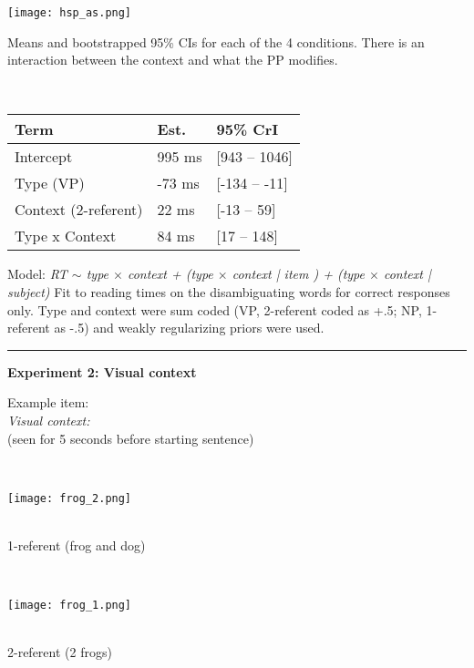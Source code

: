 \documentclass[11pt,a4paper]{article}
\begin{document}
\begin{minipage}{.5\textwidth}
	{	\texttt{[image: hsp\_as.png]}} 
	\begin{small}
	Means and bootstrapped 95\% CIs for each of the 4 conditions. There is an interaction between the context and what the PP modifies. 
		
	\end{small}
	
\end{minipage}
~~
\begin{minipage}{.45\textwidth}
	\begin{small}
	\begin{tabular}{|l|l|l|}
		\hline
		Term & Est. & 95\% CrI \\
		\hline
		Intercept & 995 ms & [943 -- 1046] \\
		Type (VP) & -73 ms & [-134 -- -11] \\
		Context (2-referent) & 22 ms & [-13 -- 59] \\
		Type x Context & 84 ms  & [17 -- 148] \\
		\hline
	\end{tabular}
	
	 Model: \textit{RT $\sim$ type $\times$ context + (type $\times$ context | item ) + (type $\times$ context | subject) } 
Fit to reading times on the disambiguating words for correct responses only. Type and context were sum coded (VP, 2-referent coded as +.5; NP, 1-referent as -.5) and weakly regularizing priors were used. 
	 \end{small}
	 	
\end{minipage}

\smallskip
\rule{\textwidth}{1pt}
\begin{center}\textbf{Experiment 2: Visual context}\end{center}

	\begin{minipage}{.3\textwidth}
	\begin{small}Example item:\\\textit{Visual context:} \\ (seen for 5 seconds before starting sentence) \end{small}
\end{minipage}	~~~
\begin{minipage}{.3\textwidth}
\texttt{[image: frog\_2.png]}		\begin{small}\\
	1-referent (frog and dog) \end{small}

\end{minipage}
~~~
\begin{minipage}{.3\textwidth}	
\texttt{[image: frog\_1.png]}
\begin{small}\\ 2-referent (2 frogs) \end{small}

\end{minipage}
\end{document}
